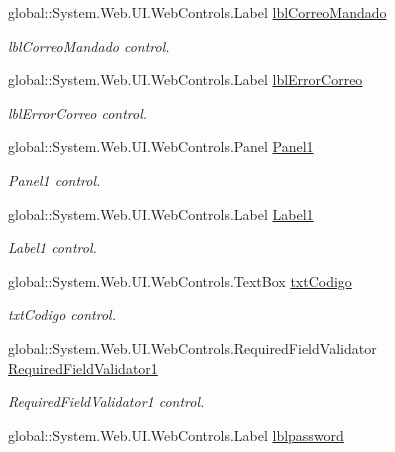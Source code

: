 \begin{DoxyCompactItemize}
global\+::\+System.\+Web.\+U\+I.\+Web\+Controls.\+Label \mbox{\hyperlink{classwebprueba_1_1_cambiar_password_a15e8380ba026f9b5caafa4a32cbf1514}{lbl\+Correo\+Mandado}}
\begin{DoxyCompactList}\small\item\em lbl\+Correo\+Mandado control. \end{DoxyCompactList}\item 
global\+::\+System.\+Web.\+U\+I.\+Web\+Controls.\+Label \mbox{\hyperlink{classwebprueba_1_1_cambiar_password_a9cefb5bb5053c7f80c6bd8e659179377}{lbl\+Error\+Correo}}
\begin{DoxyCompactList}\small\item\em lbl\+Error\+Correo control. \end{DoxyCompactList}\item 
global\+::\+System.\+Web.\+U\+I.\+Web\+Controls.\+Panel \mbox{\hyperlink{classwebprueba_1_1_cambiar_password_ac4473c985a1ebb7d5f7fe56bcac1c86c}{Panel1}}
\begin{DoxyCompactList}\small\item\em Panel1 control. \end{DoxyCompactList}\item 
global\+::\+System.\+Web.\+U\+I.\+Web\+Controls.\+Label \mbox{\hyperlink{classwebprueba_1_1_cambiar_password_afe3f9bcf81db93a914497ee4e37124f5}{Label1}}
\begin{DoxyCompactList}\small\item\em Label1 control. \end{DoxyCompactList}\item 
global\+::\+System.\+Web.\+U\+I.\+Web\+Controls.\+Text\+Box \mbox{\hyperlink{classwebprueba_1_1_cambiar_password_a25d2a6436d74e1f098a4fb346529f767}{txt\+Codigo}}
\begin{DoxyCompactList}\small\item\em txt\+Codigo control. \end{DoxyCompactList}\item 
global\+::\+System.\+Web.\+U\+I.\+Web\+Controls.\+Required\+Field\+Validator \mbox{\hyperlink{classwebprueba_1_1_cambiar_password_aa5b8d9938e44f22494427dc175cd4789}{Required\+Field\+Validator1}}
\begin{DoxyCompactList}\small\item\em Required\+Field\+Validator1 control. \end{DoxyCompactList}\item 
global\+::\+System.\+Web.\+U\+I.\+Web\+Controls.\+Label \mbox{\hyperlink{classwebprueba_1_1_cambiar_password_aa4af6c9e8848dcef0a3357461ae5eb0a}{lblpassword}}

\end{DoxyCompactItemize}

